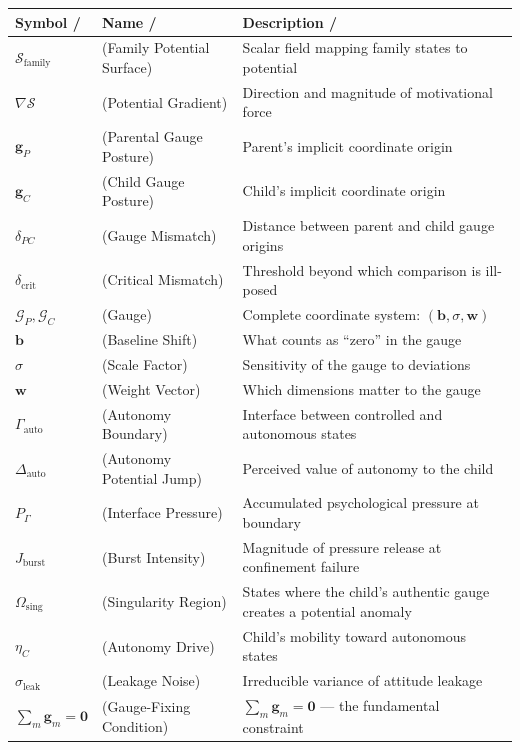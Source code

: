 \documentclass[11pt,a4paper]{article}
\newcommand{\cS}{\mathcal{S}}
\newcommand{\cG}{\mathcal{G}}
\newcommand{\gradS}{\nabla\mathcal{S}}
\newcommand{\sumgd}{\sum_m \mathbf{g}_m = \mathbf{0}}
\begin{document}
\begin{center}
\begin{tabular}{p{3.5cm} p{4cm} p{7cm}}
\toprule
\textbf{Symbol / } & \textbf{Name / } & \textbf{Description / } \\
\midrule
$\cS_{\text{family}}$ &  (Family Potential Surface) & Scalar field mapping family states to potential \\
$\gradS$ &  (Potential Gradient) & Direction and magnitude of motivational force \\
$\mathbf{g}_P$ &  (Parental Gauge Posture) & Parent's implicit coordinate origin \\
$\mathbf{g}_C$ &  (Child Gauge Posture) & Child's implicit coordinate origin \\
$\delta_{PC}$ &  (Gauge Mismatch) & Distance between parent and child gauge origins \\
$\delta_{\text{crit}}$ &  (Critical Mismatch) & Threshold beyond which comparison is ill-posed \\
$\cG_P, \cG_C$ &  (Gauge) & Complete coordinate system: $(\mathbf{b}, \sigma, \mathbf{w})$ \\
$\mathbf{b}$ &  (Baseline Shift) & What counts as ``zero'' in the gauge \\
$\sigma$ &  (Scale Factor) & Sensitivity of the gauge to deviations \\
$\mathbf{w}$ &  (Weight Vector) & Which dimensions matter to the gauge \\
$\Gamma_{\text{auto}}$ &  (Autonomy Boundary) & Interface between controlled and autonomous states \\
$\Delta_{\text{auto}}$ &  (Autonomy Potential Jump) & Perceived value of autonomy to the child \\
$P_{\Gamma}$ &  (Interface Pressure) & Accumulated psychological pressure at boundary \\
$J_{\text{burst}}$ &  (Burst Intensity) & Magnitude of pressure release at confinement failure \\
$\Omega_{\text{sing}}$ &  (Singularity Region) & States where the child's authentic gauge creates a potential anomaly \\
$\eta_C$ &  (Autonomy Drive) & Child's mobility toward autonomous states \\
$\sigma_{\text{leak}}$ &  (Leakage Noise) & Irreducible variance of attitude leakage \\
$\sumgd$ &  (Gauge-Fixing Condition) & $\sum_m \mathbf{g}_m = \mathbf{0}$ — the fundamental constraint \\
\bottomrule
\end{tabular}
\end{center}
\end{document}

